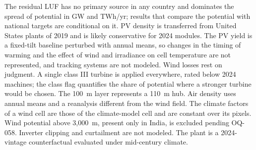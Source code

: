 The residual LUF has no primary source in any country and dominates the
spread of potential in GW and TWh/yr; results that compare the potential
with national targets are conditional on it. PV density is
transferred from United States plants of 2019 and is likely
conservative for 2024 modules. The PV yield is a fixed-tilt baseline
perturbed with annual means, so changes in the timing of warming and the
effect of wind and irradiance on cell temperature are not represented,
and tracking systems are not modeled. Wind losses rest on judgment. A
single class III turbine is applied everywhere, rated below 2024
machines; the class flag quantifies the share of potential where a
stronger turbine would be chosen. The 100~m layer represents a 110~m
hub. Air density uses annual means and a reanalysis different from the
wind field. The climate factors of a wind cell are those of the climate-model
cell and are constant over its pixels. Wind potential above 3,000~m, present only in India, is excluded
pending OQ-058. Inverter clipping and curtailment are not modeled. The plant
is a 2024-vintage counterfactual evaluated under mid-century climate.
